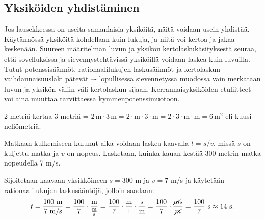 


\subsection*{Yksiköiden yhdistäminen}


Jos lausekkeessa on useita samanlaisia yksiköitä, näitä voidaan usein yhdistää. Käytännössä yksiköitä kohdellaan kuin lukuja, ja niitä voi kertoa ja jakaa keskenään. Suureen määritelmän luvun ja yksikön kertolaskukäsityksestä seuraa, että sovelluksissa ja sievennystehtävissä yksiköillä voidaan laskea kuin luvuilla. Tutut potenssisäännöt, rationaalilukujen laskusäännöt ja kertolaskun vaihdannaisuuslaki pätevät –- lopullisessa sievennetyssä muodossa vain merkataan luvun ja yksikön väliin väli kertolaskun sijaan. Kerrannaisyksiköiden etuliitteet voi aina muuttaa tarvittaessa kymmenpotenssimuotoon.

\begin{esimerkki}
2 metriä kertaa 3 metriä = $2\, \text{m} \cdot 3\, \text{m} = 2 \cdot \text{m} \cdot 3 \cdot \text{m}= 2 \cdot 3 \cdot \text{m} \cdot \text{m} =6\, \text{m}^2$ eli kuusi neliömetriä.
\end{esimerkki}


\begin{esimerkki}
Matkaan kulkemiseen kulunut aika voidaan laskea kaavalla $t=s/v$, missä $s$ on kuljettu matka ja $v$ on nopeus. Lasketaan, kuinka kauan kestää 300 metrin matka nopeudella 7 m/s.

Sijoitetaan kaavaan yksikköineen $s=300$ m ja $v= 7$ m/s ja käytetään rationaalilukujen laskusääntöjä, jolloin saadaan:
\begin{equation*}
t=\frac{100 \textrm{ m}}{ 7 \textrm{ m/s}} = \frac{100}{7} \cdot \frac{\textrm{m}}{\frac{\textrm{m}}{\textrm{s}}} 
= \frac{100}{7} \cdot \frac{\textrm{m}}{1} \cdot \frac{\textrm{s}}{\textrm{m}}
= \frac{100}{7} \cdot \frac{\cancel{m}\textrm{s}}{\cancel{m}}
=\frac{100}{7} \textrm{ s} \approx 14 \textrm{ s}.
\end{equation*}
\end{esimerkki}

